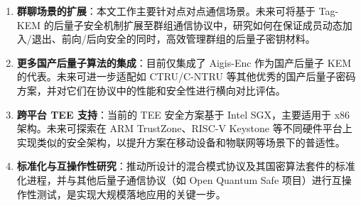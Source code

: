\begin{enumerate}
    \item \textbf{群聊场景的扩展}：本文工作主要针对点对点通信场景。未来可将基于 Tag-KEM 的后量子安全机制扩展至群组通信协议中，研究如何在保证成员动态加入/退出、前向/后向安全的同时，高效管理群组的后量子密钥材料。

    \item \textbf{更多国产后量子算法的集成}：目前仅集成了 Aigis-Enc 作为国产后量子 KEM 的代表。未来可进一步适配如 CTRU/C-NTRU 等其他优秀的国产后量子密码方案，并对它们在协议中的性能和安全性进行横向对比评估。

    \item \textbf{跨平台 TEE 支持}：当前的 TEE 安全方案基于 Intel SGX，主要适用于 x86 架构。未来可探索在 ARM TrustZone、RISC-V Keystone 等不同硬件平台上实现类似的安全架构，以提升方案在移动设备和物联网等场景下的普适性。

    \item \textbf{标准化与互操作性研究}：推动所设计的混合模式协议及其国密算法套件的标准化进程，并与其他后量子通信协议（如 Open Quantum Safe 项目）进行互操作性测试，是实现大规模落地应用的关键一步。
\end{enumerate}